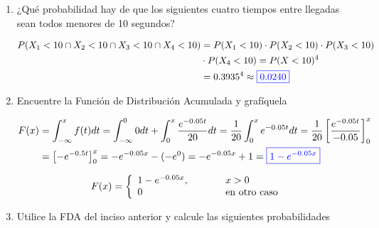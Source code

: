 \documentclass[12pt]{report}
\begin{document}
\begin{enumerate}
\begin{enumerate}[label=\alph*.]
    \item ¿Qué probabilidad hay de que los siguientes cuatro tiempos entre llegadas sean todos menores de 10 segundos?
    
    \begin{align*}
      P(X_1 < 10 \cap X_2 < 10 \cap X_3 < 10 \cap X_4 < 10) &= P(X_1 < 10) \cdot P(X_2 < 10) \cdot P(X_3 < 10) \\
      & \cdot P(X_4 < 10) = P(X < 10)^4 \\ 
      &= 0.3935^4 \approx {\color{blue}\boxed{0.0240}}
    \end{align*}
    
    \item Encuentre la Función de Distribución Acumulada y grafíquela
    
    \begin{align*}
      F(x) &= \int_{-\infty}^x f(t)dt = \int_{-\infty}^0 0dt + \int_0^x \frac{e^{-0.05t}}{20} dt = \frac{1}{20} \int_0^x e^{-0.05t} dt = \frac{1}{20} \left[ \frac{e^{-0.05t}}{-0.05} \right]_0^x \\ 
      &= \left[ -e^{-0.5t} \right]_0^x = -e^{-0.05x} - (-e^0) = -e^{-0.05x} + 1 = {\color{blue}\boxed{1 - e^{-0.05x}}}
    \end{align*}

    \[
      F(x) = \left\{
      \begin{array}{ll}
          1 - e^{-0.05x}, & \hspace*{1cm} x > 0 \\
          0 & \hspace*{1cm} \text{en otro caso}
      \end{array}
      \right.
    \]

    \begin{center}
    \end{center}

    \item Utilice la FDA del inciso anterior y calcule las siguientes probabilidades
    

\end{enumerate}
\end{enumerate}
\end{document}
